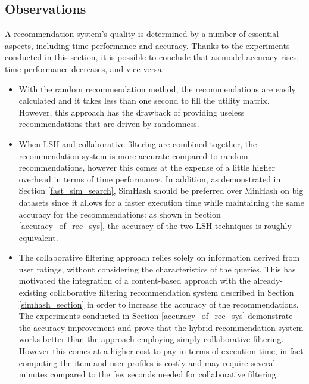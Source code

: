 \subsection{Observations}
A recommendation system's quality is determined by a number of essential aspects, including time performance and accuracy. Thanks to the experiments conducted in this section, it is possible to conclude that as model accuracy rises, time performance decreases, and vice versa:
\begin{itemize}
    \item With the random recommendation method, the recommendations are easily calculated and it takes less than one second to fill the utility matrix. However, this approach has the drawback of providing useless recommendations that are driven by randomness.
    \item When LSH and collaborative filtering are combined together, the recommendation system is more accurate compared to random recommendations, however this comes at the expense of a little higher overhead in terms of time performance. In addition, as demonstrated in Section \ref{fast_sim_search}, SimHash should be preferred over MinHash on big datasets since it allows for a faster execution time while maintaining the same accuracy for the recommendations: as shown in Section \ref{accuracy_of_rec_sys}, the accuracy of the two LSH techniques is roughly equivalent. 
    \item The collaborative filtering approach relies solely on information derived from user ratings, without considering the characteristics of the queries. This has motivated the integration of a content-based approach with the already-existing collaborative filtering recommendation system described in Section \ref{simhash_section} in order to increase the accuracy of the recommendations. The experiments conducted in Section \ref{accuracy_of_rec_sys} demonstrate the accuracy improvement and prove that the hybrid recommendation system works better than the approach employing simply collaborative filtering. However this comes at a higher cost to pay in terms of execution time, in fact computing the item and user profiles is costly and may require several minutes compared to the few seconds needed for collaborative filtering.
\end{itemize}


